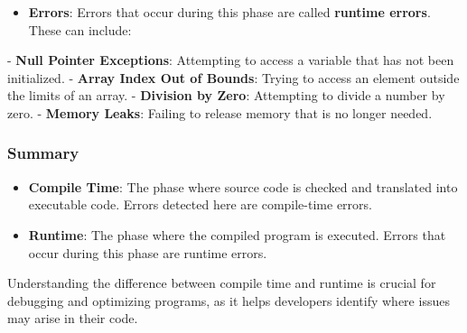 \begin{botresponse}
\begin{itemize}
\item \textbf{Errors}: Errors that occur during this phase are called \textbf{runtime errors}. These can include:
\end{itemize}

- \textbf{Null Pointer Exceptions}: Attempting to access a variable that has not been initialized.
- \textbf{Array Index Out of Bounds}: Trying to access an element outside the limits of an array.
- \textbf{Division by Zero}: Attempting to divide a number by zero.
- \textbf{Memory Leaks}: Failing to release memory that is no longer needed.

\subsubsection{Summary}

\begin{itemize}
\item \textbf{Compile Time}: The phase where source code is checked and translated into executable code. Errors detected here are compile-time errors.
\item \textbf{Runtime}: The phase where the compiled program is executed. Errors that occur during this phase are runtime errors.
\end{itemize}

Understanding the difference between compile time and runtime is crucial for debugging and optimizing programs, as it helps developers identify where issues may arise in their code.

\end{botresponse}